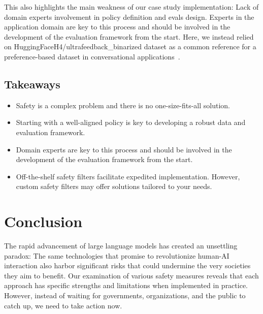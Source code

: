 This also highlights the main weakness of our case study implementation: Lack of domain experts involvement in policy definition and evals design. Experts in the application domain are key to this process and should be involved in the development of the evaluation framework from the start. Here, we instead relied on HuggingFaceH4/ultrafeedback\_binarized dataset as a common reference for a preference-based dataset in conversational applications~.

\subsection{Takeaways}

\begin{itemize}
\item Safety is a complex problem and there is no one-size-fits-all solution.
\item Starting with a well-aligned policy is key to developing a robust data and evaluation framework.
\item Domain experts are key to this process and should be involved in the development of the evaluation framework from the start.
\item Off-the-shelf safety filters facilitate expedited implementation. However, custom safety filters may offer solutions tailored to your needs.
\end{itemize}

\section{Conclusion}

The rapid advancement of large language models has created an unsettling paradox: The same technologies that promise to revolutionize human-AI interaction also harbor significant risks that could undermine the very societies they aim to benefit. Our examination of various safety measures reveals that each approach has specific strengths and limitations when implemented in practice. However, instead of waiting for governments, organizations, and the public to catch up, we need to take action now.

